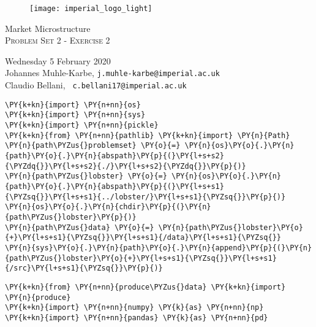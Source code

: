 \documentclass[9pt]{article}
\begin{document}
    
	
	\begin{center}
		\begin{figure}
			\texttt{[image: imperial\_logo\_light]}
		\end{figure}
	\begin{Large}
		Market Microstructure \\
		\textsc{Problem Set 2 - Exercise 2}
	\end{Large}
	\end{center}

\vspace{0.2cm}

\noindent Wednesday 5 February 2020 \\
\noindent Johannes Muhle-Karbe, \small{\texttt{j.muhle-karbe@imperial.ac.uk}} \\
\noindent Claudio Bellani, \small{\texttt{ c.bellani17@imperial.ac.uk}}

\vspace{0.5cm}
    

    
    \begin{tcolorbox}[breakable, size=fbox, boxrule=1pt, pad at break*=1mm,colback=cellbackground, colframe=cellborder]
\begin{Verbatim}[commandchars=\\\{\}]
\PY{k+kn}{import} \PY{n+nn}{os} 
\PY{k+kn}{import} \PY{n+nn}{sys}
\PY{k+kn}{import} \PY{n+nn}{pickle}
\PY{k+kn}{from} \PY{n+nn}{pathlib} \PY{k+kn}{import} \PY{n}{Path}
\PY{n}{path\PYZus{}problemset} \PY{o}{=} \PY{n}{os}\PY{o}{.}\PY{n}{path}\PY{o}{.}\PY{n}{abspath}\PY{p}{(}\PY{l+s+s2}{\PYZdq{}}\PY{l+s+s2}{./}\PY{l+s+s2}{\PYZdq{}}\PY{p}{)}
\PY{n}{path\PYZus{}lobster} \PY{o}{=} \PY{n}{os}\PY{o}{.}\PY{n}{path}\PY{o}{.}\PY{n}{abspath}\PY{p}{(}\PY{l+s+s1}{\PYZsq{}}\PY{l+s+s1}{../lobster/}\PY{l+s+s1}{\PYZsq{}}\PY{p}{)}
\PY{n}{os}\PY{o}{.}\PY{n}{chdir}\PY{p}{(}\PY{n}{path\PYZus{}lobster}\PY{p}{)}
\PY{n}{path\PYZus{}data} \PY{o}{=} \PY{n}{path\PYZus{}lobster}\PY{o}{+}\PY{l+s+s1}{\PYZsq{}}\PY{l+s+s1}{/data}\PY{l+s+s1}{\PYZsq{}}
\PY{n}{sys}\PY{o}{.}\PY{n}{path}\PY{o}{.}\PY{n}{append}\PY{p}{(}\PY{n}{path\PYZus{}lobster}\PY{o}{+}\PY{l+s+s1}{\PYZsq{}}\PY{l+s+s1}{/src}\PY{l+s+s1}{\PYZsq{}}\PY{p}{)}
\end{Verbatim}
\end{tcolorbox}

    \begin{tcolorbox}[breakable, size=fbox, boxrule=1pt, pad at break*=1mm,colback=cellbackground, colframe=cellborder]
\begin{Verbatim}[commandchars=\\\{\}]
\PY{k+kn}{from} \PY{n+nn}{produce\PYZus{}data} \PY{k+kn}{import} \PY{n}{produce}
\PY{k+kn}{import} \PY{n+nn}{numpy} \PY{k}{as} \PY{n+nn}{np}
\PY{k+kn}{import} \PY{n+nn}{pandas} \PY{k}{as} \PY{n+nn}{pd}
\end{Verbatim}
\end{tcolorbox}
\end{document}
